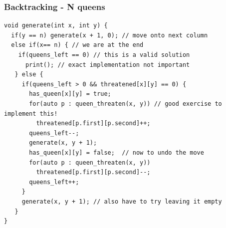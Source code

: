 \documentclass{beamer}
\begin{document}
\begin{frame}
	\frametitle{Backtracking - N queens}
	\begin{scriptsize}
	\begin{verbatim}
void generate(int x, int y) {
  if(y == n) generate(x + 1, 0); // move onto next column
  else if(x== n) { // we are at the end
    if(queens_left == 0) // this is a valid solution
      print(); // exact implementation not important
   } else {
     if(queens_left > 0 && threatened[x][y] == 0) {
       has_queen[x][y] = true;
       for(auto p : queen_threaten(x, y)) // good exercise to implement this!
         threatened[p.first][p.second]++; 
       queens_left--;
       generate(x, y + 1);
       has_queen[x][y] = false;  // now to undo the move
       for(auto p : queen_threaten(x, y))
         threatened[p.first][p.second]--; 
       queens_left++;
     }
     generate(x, y + 1); // also have to try leaving it empty
   }
}
	\end{verbatim}
	\end{scriptsize}
\end{frame}
\end{document}
